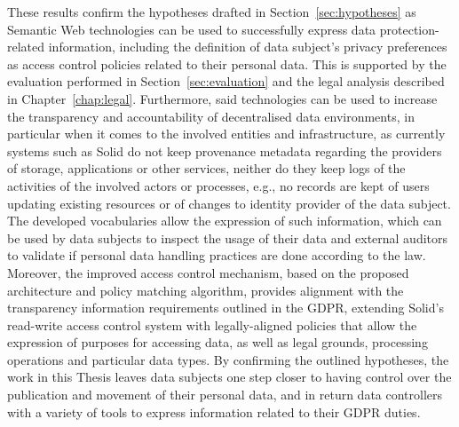 These results confirm the hypotheses drafted in Section~\ref{sec:hypotheses} as Semantic Web technologies can be used to successfully express data protection-related information, including the definition of data subject's privacy preferences as access control policies related to their personal data.
This is supported by the evaluation performed in Section~\ref{sec:evaluation} and the legal analysis described in Chapter~\ref{chap:legal}.
Furthermore, said technologies can be used to increase the transparency and accountability of decentralised data environments, in particular when it comes to the involved entities and infrastructure, as currently systems such as Solid do not keep provenance metadata regarding the providers of storage, applications or other services, neither do they keep logs of the activities of the involved actors or processes, e.g., no records are kept of users updating existing resources or of changes to identity provider of the data subject.
The developed vocabularies allow the expression of such information, which can be used by data subjects to inspect the usage of their data and external auditors to validate if personal data handling practices are done according to the law.
Moreover, the improved access control mechanism, based on the proposed architecture and policy matching algorithm, provides alignment with the transparency information requirements outlined in the GDPR, extending Solid's read-write access control system with legally-aligned policies that allow the expression of purposes for accessing data, as well as legal grounds, processing operations and particular data types.
By confirming the outlined hypotheses, the work in this Thesis leaves data subjects one step closer to having control over the publication and movement of their personal data, and in return data controllers with a variety of tools to express information related to their GDPR duties.